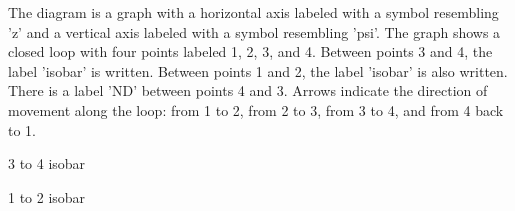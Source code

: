 The diagram is a graph with a horizontal axis labeled with a symbol resembling 'z' and a vertical axis labeled with a symbol resembling 'psi'. The graph shows a closed loop with four points labeled 1, 2, 3, and 4. Between points 3 and 4, the label 'isobar' is written. Between points 1 and 2, the label 'isobar' is also written. There is a label 'ND' between points 4 and 3. Arrows indicate the direction of movement along the loop: from 1 to 2, from 2 to 3, from 3 to 4, and from 4 back to 1.

3 to 4 isobar

1 to 2 isobar